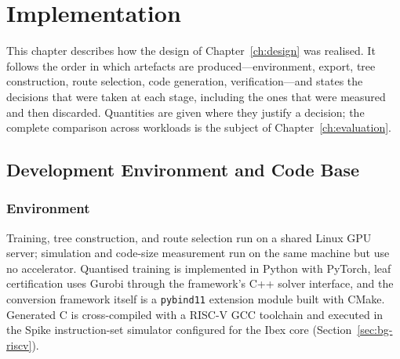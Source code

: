 \chapter{Implementation}
\label{ch:implementation}


This chapter describes how the design of Chapter~\ref{ch:design} was realised.
It follows the order in which artefacts are produced---environment, export, tree construction, route selection, code generation, verification---and states the decisions that were taken at each stage, including the ones that were measured and then discarded.
Quantities are given where they justify a decision; the complete comparison across workloads is the subject of Chapter~\ref{ch:evaluation}.


\section{Development Environment and Code Base}
\label{sec:impl-environment}

\subsection{Environment}

Training, tree construction, and route selection run on a shared Linux \ac{GPU} server; simulation and code-size measurement run on the same machine but use no accelerator.
Quantised training is implemented in Python with PyTorch, leaf certification uses Gurobi through the framework's C++ solver interface, and the conversion framework itself is a \texttt{pybind11} extension module built with CMake.
Generated C is cross-compiled with a \mbox{RISC-V} GCC toolchain and executed in the Spike instruction-set simulator configured for the Ibex core (Section~\ref{sec:bg-riscv}).

